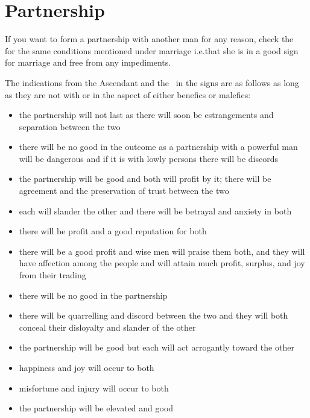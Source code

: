 \section{Partnership}
If  you want to form a partnership with another man for any reason, check the \Moon\, for the same conditions mentioned under marriage i.e.that she is in a good sign for marriage and free from any impediments.

The indications from the Ascendant and the \Moon\, in the signs are as follows as long as they are not with or in the aspect of either benefics or malefics:
\begin{itemize}[topsep=0em,itemsep=0em]
\item[\Aries] the partnership will not last as there will soon be estrangements and separation between the two
\item[\Taurus] there will be no good in the outcome as a partnership with a powerful man will be dangerous and if it is with lowly persons there will be discords
\item[\Gemini] the partnership will be good and both will profit by it; there will be agreement and the preservation of trust between the two
\item[\Cancer] each will slander the other and there will be betrayal and anxiety in both
\item[\Leo] there will be profit and a good reputation for both
\item[\Virgo] there will be a good profit and wise men will praise them both, and they will have affection among the people and will attain much profit, surplus, and joy from their trading
\item[\Libra] there will be no good in the partnership
\item[\Scorpio] there will be quarrelling and discord between the two and they will both conceal their disloyalty and slander of the other
\item[\Sagittarius] the partnership will be good but each will act arrogantly toward the other
\item[\Capricorn] happiness and joy will occur to both
\item[\Aquarius] misfortune and injury will occur to both
\item[\Pisces] the partnership will be elevated and good
\end{itemize}


